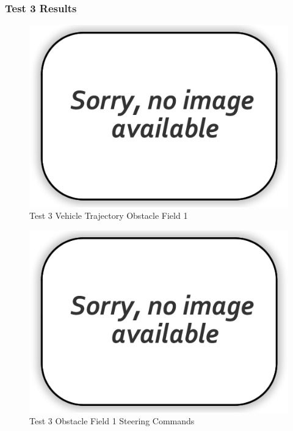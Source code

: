\documentclass[12pt,twocolumn]{article}
\begin{document}

\subsubsection{Test 3 Results}\label{sss:Test3}

\begin{figure}
	\centering
	\includegraphics[width=\columnwidth]{Figs/no-image.png}
	\caption{\small Test 3 Vehicle Trajectory Obstacle Field 1}  
	\label{fig:Test3_Obst1}
\end{figure}

\begin{figure}
	\centering
	\includegraphics[width=\columnwidth]{Figs/no-image.png}
	\caption{\small Test 3 Obstacle Field 1 Steering Commands}  
	\label{fig:Test3_Obst1_Steer}
\end{figure}
\end{document}
